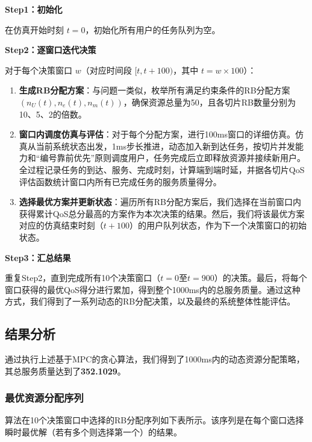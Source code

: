 \textbf{Step1：初始化}

在仿真开始时刻 $t=0$，初始化所有用户的任务队列为空。

\textbf{Step2：逐窗口迭代决策}

对于每个决策窗口 $w$（对应时间段 $[t, t+100)$，其中 $t = w \times 100$）：

\begin{enumerate}
    \item \textbf{生成RB分配方案}：与问题一类似，枚举所有满足约束条件的RB分配方案 $(n_U(t), n_e(t), n_m(t))$，确保资源总量为50，且各切片RB数量分别为10、5、2的倍数。

    \item \textbf{窗口内调度仿真与评估}：对于每个分配方案，进行100ms窗口的详细仿真。仿真从当前系统状态出发，1ms步长推进，动态加入新到达任务，按切片并发能力和“编号靠前优先”原则调度用户，任务完成后立即释放资源并接续新用户。全过程记录任务的到达、服务、完成时刻，计算端到端时延，并据各切片QoS评估函数统计窗口内所有已完成任务的服务质量得分。
    
    \item \textbf{选择最优方案并更新状态}：遍历所有RB分配方案后，我们选择在当前窗口内获得累计QoS总分最高的方案作为本次决策的结果。然后，我们将该最优方案对应的仿真结束时刻（$t+100$）的用户队列状态，作为下一个决策窗口的初始状态。
\end{enumerate}

\textbf{Step3：汇总结果}

重复Step2，直到完成所有10个决策窗口（$t=0$至$t=900$）的决策。最后，将每个窗口获得的最优QoS得分进行累加，得到整个1000ms内的总服务质量。通过这种方式，我们得到了一系列动态的RB分配决策，以及最终的系统整体性能评估。

\subsection{结果分析}

通过执行上述基于MPC的贪心算法，我们得到了1000ms内的动态资源分配策略，其总服务质量达到了\textbf{352.1029}。

\subsubsection{最优资源分配序列}

算法在10个决策窗口中选择的RB分配序列如下表所示。该序列是在每个窗口选择瞬时最优解（若有多个则选择第一个）的结果。

